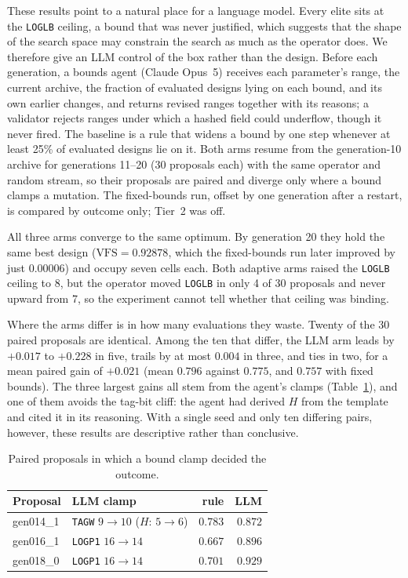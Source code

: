 \documentclass[conference]{IEEEtran}
\newcommand{\vfs}{\text{VFS}}
\begin{document}
These results point to a natural place for a language model. Every elite sits
at the \texttt{LOGLB} ceiling, a bound that was never justified, which suggests
that the shape of the search space may constrain the search as much as the
operator does. We therefore give an LLM control of the box rather than the
design. Before each generation, a bounds agent (Claude Opus~5) receives each
parameter's range, the current archive, the fraction of evaluated designs lying
on each bound, and its own earlier changes, and returns revised ranges together
with its reasons; a validator rejects ranges under which a hashed field could
underflow, though it never fired. The baseline is a rule that widens a bound by
one step whenever at least 25\% of evaluated designs lie on it. Both arms resume
from the generation-10 archive for generations 11--20 (30 proposals each) with
the same operator and random stream, so their proposals are paired and diverge
only where a bound clamps a mutation. The fixed-bounds run, offset by one
generation after a restart, is compared by outcome only; Tier~2 was off.

All three arms converge to the same optimum. By generation 20 they hold the same
best design ($\vfs{}=0.92878$, which the fixed-bounds run later improved by just
$0.00006$) and occupy seven cells each. Both adaptive arms raised the
\texttt{LOGLB} ceiling to 8, but the operator moved \texttt{LOGLB} in only 4 of
30 proposals and never upward from 7, so the experiment cannot tell whether that
ceiling was binding.

Where the arms differ is in how many evaluations they waste. Twenty of the 30
paired proposals are identical. Among the ten that differ, the LLM arm leads by
$+0.017$ to $+0.228$ in five, trails by at most $0.004$ in three, and ties in
two, for a mean paired gain of $+0.021$ (mean \vfs{} $0.796$ against $0.775$,
and $0.757$ with fixed bounds). The three largest gains all stem from the
agent's clamps (Table~\ref{tab:bounds}), and one of them avoids the tag-bit
cliff: the agent had derived $H$ from the template and cited it in its
reasoning. With a single seed and only ten differing pairs, however, these
results are descriptive rather than conclusive.

\begin{table}[t]
\caption{Paired proposals in which a bound clamp decided the outcome.}
\label{tab:bounds}
\centering\footnotesize
\begin{tabular}{@{}llrr@{}}
\toprule
Proposal & LLM clamp & rule \vfs{} & LLM \vfs{} \\
\midrule
gen014\_1 & \texttt{TAGW} $9\to10$ ($H$: $5\to6$) & $0.783$ & $0.872$ \\
gen016\_1 & \texttt{LOGP1} $16\to14$ & $0.667$ & $0.896$ \\
gen018\_0 & \texttt{LOGP1} $16\to14$ & $0.701$ & $0.929$ \\
\bottomrule
\end{tabular}
\end{table}
\end{document}
